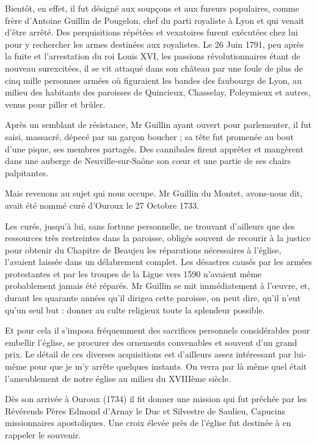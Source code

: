 Bientôt, en effet, il fut désigné aux soupçons et aux fureurs populaires, comme frère d'Antoine Guillin de Pougelon, chef du parti royaliste à Lyon et qui venait d'être arrêté. Des perquisitions répétées et vexatoires furent exécutées chez lui pour y rechercher les armes destinées aux royalistes. Le 26 Juin 1791, peu après la fuite et l'arrestation du roi Louis XVI, les passions révolutionnaires étant de nouveau surexcitées, il se vit attaqué dans son château par une foule de plus de cinq mille personnes armées où figuraient les bandes des faubourgs de Lyon, au milieu des habitants des paroisses de Quincieux, Chasselay, Poleymieux et autres, venus pour piller et brûler.

Après un semblant de résistance, Mr Guillin ayant ouvert pour parlementer, il fut saisi, massacré, dépecé par un garçon boucher ; sa tête fut promenée au bout d'une pique, ses membres partagés. Des cannibales firent apprêter et mangèrent dans une auberge de Neuville-sur-Saône son cœur et une partie de ses chairs palpitantes.

Mais revenons au sujet qui nous occupe. Mr Guillin du Montet, avons-nous dit, avait été nommé curé d'Ouroux le 27 Octobre 1733.

Les curés, jusqu'à lui, sans fortune personnelle, ne trouvant d'ailleurs que des ressources très restreintes dans la paroisse, obligés souvent de recourir à la justice pour obtenir du Chapitre de Beaujeu les réparations nécessaires à l'église, l'avaient laissée dans un délabrement complet. Les désastres causés par les armées protestantes et par les troupes de la Ligue vers 1590 n'avaient même probablement jamais été réparés. Mr Guillin se mit immédiatement à l'œuvre, et, durant les quarante années qu'il dirigea cette paroisse, on peut dire, qu'il n'eut qu'un seul but : donner au culte religieux toute la splendeur possible.

Et pour cela il s'imposa fréquemment des sacrifices personnels considérables pour embellir l'église, se procurer des ornements convenables et souvent d'un grand prix. Le détail de ces diverses acquisitions est d'ailleurs assez intéressant par lui-même pour que je m'y arrête quelques instants. On verra par là même quel était l'ameublement de notre église au milieu du XVIIIème siècle.

Dès son arrivée à Ouroux (1734) il fit donner une mission qui fut prêchée par les Révérends Pères Edmond d'Arnay le Duc et Silvestre de Saulieu, Capucins missionnaires apostoliques. Une croix élevée près de l'église fut destinée à en rappeler le souvenir.

